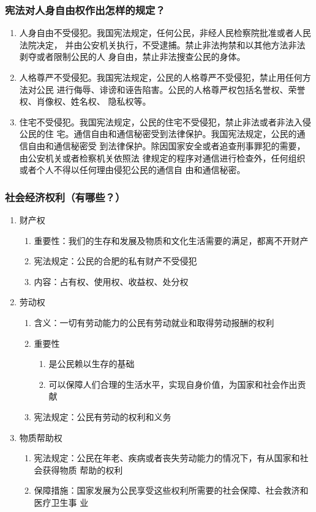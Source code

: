 \documentclass[11pt]{article}
\begin{document}
\subsubsection{宪法对人身自由权作出怎样的规定？}
\label{sec:org2a868df}
\begin{enumerate}
\item 人身自由不受侵犯。我国宪法规定，任何公民，非经人民检察院批准或者人民法院决定，
并由公安机关执行，不受逮捕。禁止非法拘禁和以其他方法非法剥夺或者限制公民的人
身自由，禁止非法搜查公民的身体。
\item 人格尊严不受侵犯。我国宪法规定，公民的人格尊严不受侵犯，禁止用任何方法对公民
进行侮辱、诽谤和诬告陷害。公民的人格尊严权包括名誉权、荣誉权、肖像权、姓名权、
隐私权等。
\item 住宅不受侵犯。我国宪法规定，公民的住宅不受侵犯，禁止非法或者非法入侵公民的住
宅。通信自由和通信秘密受到法律保护。我国宪法规定，公民的通信自由和通信秘密受
到法律保护。除因国家安全或者追查刑事罪犯的需要，由公安机关或者检察机关依照法
律规定的程序对通信进行检查外，任何组织或者个人不得以任何理由侵犯公民的通信自
由和通信秘密。
\end{enumerate}
\subsubsection{社会经济权利（有哪些？）}
\label{sec:orgf92f77f}
\begin{enumerate}
\item 财产权
\begin{enumerate}
\item 重要性：我们的生存和发展及物质和文化生活需要的满足，都离不开财产
\item 宪法规定：公民的合肥的私有财产不受侵犯
\item 内容：占有权、使用权、收益权、处分权
\end{enumerate}
\item 劳动权
\begin{enumerate}
\item 含义：一切有劳动能力的公民有劳动就业和取得劳动报酬的权利
\item 重要性
\begin{enumerate}
\item 是公民赖以生存的基础
\item 可以保障人们合理的生活水平，实现自身价值，为国家和社会作出贡献
\end{enumerate}
\item 宪法规定：公民有劳动的权利和义务
\end{enumerate}
\item 物质帮助权
\begin{enumerate}
\item 宪法规定：公民在年老、疾病或者丧失劳动能力的情况下，有从国家和社会获得物质
帮助的权利
\item 保障措施：国家发展为公民享受这些权利所需要的社会保障、社会救济和医疗卫生事
业
\end{enumerate}
\end{enumerate}
\end{document}
